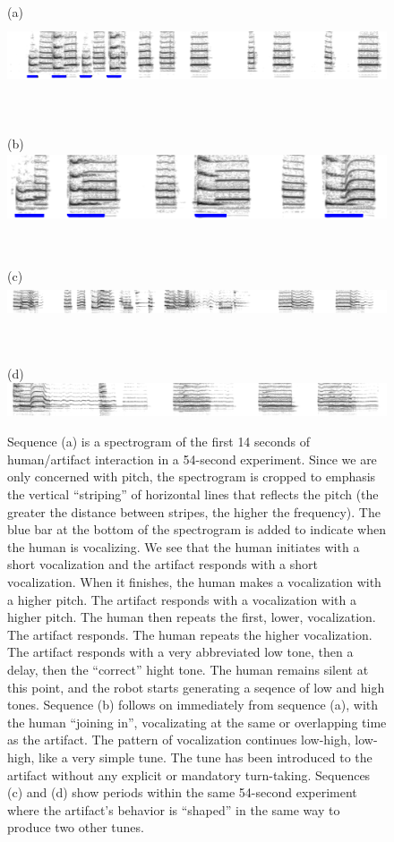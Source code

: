 \begin{figure}[hbt]

\centerline{(a) \includegraphics[height=2cm]{images/chico-separate-begin-labelled}}

\ \\

\centerline{(b) \includegraphics[height=2cm]{images/chico-separate-together-labelled}}

\ \\

\centerline{(c) \includegraphics[height=1cm]{images/chico-pair}}

\ \\

\centerline{(d) \includegraphics[height=1cm]{images/chico-ohm}}


\caption{
%
Sequence (a) is a spectrogram of the first 14 seconds of human/artifact 
interaction in a 54-second experiment. 
Since we are only concerned with pitch, the 
spectrogram is cropped to emphasis the vertical ``striping'' of 
horizontal lines that reflects the pitch (the greater 
the distance between stripes, the higher the frequency).
The blue bar at the bottom of the spectrogram is added to 
indicate when the human is vocalizing.
%
We see that the human initiates with a short vocalization
and the artifact responds with a short vocalization.  When it
finishes, the human makes a vocalization with a higher pitch.
The artifact responds with a vocalization with a higher pitch.
The human then repeats the first, lower, vocalization.
The artifact responds.  The human repeats the higher vocalization.
The artifact responds with a very abbreviated low tone, then a delay,
then the ``correct'' hight tone.  The human remains silent at this
point, and the robot starts generating a seqence of low and high
tones.
%
Sequence (b) follows on immediately from sequence (a), with 
the human ``joining in'', vocalizating at the same or overlapping time 
as the artifact.  The pattern of vocalization continues low-high,
low-high, like a very simple tune.
%
The tune has been introduced to the artifact without any
explicit or mandatory turn-taking.
%
Sequences (c) and (d) show periods within the same 54-second experiment
where the artifact's behavior is ``shaped'' in the same way
to produce two other tunes.
}

\end{figure}
